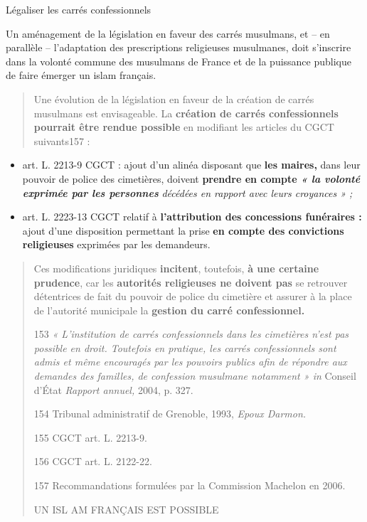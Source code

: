 Légaliser les carrés confessionnels

Un aménagement de la législation en faveur des carrés musulmans, et --
en parallèle -- l'adaptation des prescriptions religieuses musulmanes,
doit s'inscrire dans la volonté commune des musulmans de France et de la
puissance publique de faire émerger un islam français.

\begin{quote}
Une évolution de la législation en faveur de la création de carrés
musulmans est envisageable. La \textbf{création de carrés confessionnels
pourrait être rendue possible} en modifiant les articles du CGCT
suivants157 :
\end{quote}

\begin{itemize}
\item
  art. L. 2213-9 CGCT : ajout d'un alinéa disposant que \textbf{les
  maires,} dans leur pouvoir de police des cimetières, doivent
  \textbf{prendre en compte \emph{« la volonté exprimée par les
  personnes }}\emph{décédées en rapport avec leurs croyances » ;}
\item
  art. L. 2223-13 CGCT relatif à \textbf{l'attribution des concessions
  funéraires :} ajout d'une disposition permettant la prise \textbf{en
  compte des convictions religieuses} exprimées par les demandeurs.
\end{itemize}

\begin{quote}
Ces modifications juridiques \textbf{incitent}, toutefois, \textbf{à une
certaine prudence}, car les \textbf{autorités religieuses ne doivent
pas} se retrouver détentrices de fait du pouvoir de police du cimetière
et assurer à la place de l'autorité municipale la \textbf{gestion du
carré confessionnel.}

153 \emph{« L'institution de carrés confessionnels dans les cimetières
n'est pas possible en droit. Toutefois en pratique, les carrés
confessionnels sont admis et même encouragés par les pouvoirs publics
afin de répondre aux demandes des familles, de confession musulmane
notamment » in} Conseil d'État \emph{Rapport annuel,} 2004, p. 327.

154 Tribunal administratif de Grenoble, 1993, \emph{Epoux Darmon.}

155 CGCT art. L. 2213-9.

156 CGCT art. L. 2122-22.

157 Recommandations formulées par la Commission Machelon en 2006.

UN ISL AM FRANÇAIS EST POSSIBLE
\end{quote}

